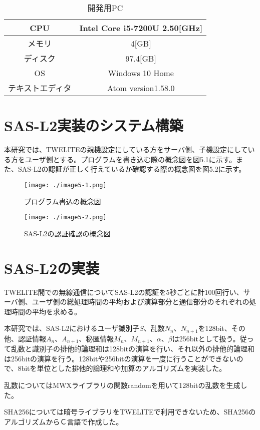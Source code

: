 \documentclass{thesis}
\begin{document}
\begin{table}[h]
  \centering
  \caption{開発用PC}
  \begin{tabular}{|c|c|} \hline
    CPU & Intel Core i5-7200U 2.50[GHz] \\ \hline
    メモリ & 4[GB] \\ \hline
    ディスク & 97.4[GB] \\ \hline
    OS & Windows 10 Home \\ \hline
    テキストエディタ & Atom version1.58.0 \\ \hline
  \end{tabular}
\end{table}

\section{SAS-L2実装のシステム構築}
本研究では、TWELITEの親機設定にしている方をサーバ側、子機設定にしている方をユーザ側とする。プログラムを書き込む際の概念図を図5.1に示す。また、SAS-L2の認証が正しく行えているか確認する際の概念図を図5.2に示す。

\begin{figure}[H]
 \center
 \texttt{[image: ./image5-1.png]}
 \caption{プログラム書込の概念図}
\end{figure}

\begin{figure}[H]
 \center
 \texttt{[image: ./image5-2.png]}
 \caption{SAS-L2の認証確認の概念図}
\end{figure}

\section{SAS-L2の実装}
TWELITE間での無線通信についてSAS-L2の認証を5秒ごとに計100回行い、サーバ側、ユーザ側の総処理時間の平均および演算部分と通信部分のそれぞれの処理時間の平均を求める。

本研究では、SAS-L2におけるユーザ識別子$S$、乱数$N_n$、$N_{n+1}$を128bit、その他、認証情報$A_n$、$A_{n+1}$、秘匿情報$M_n$、$M_{n+1}$、$\alpha$、$\beta$は256bitとして扱う。従って乱数と識別子の排他的論理和は128bitの演算を行い、それ以外の排他的論理和は256bitの演算を行う。128bitや256bitの演算を一度に行うことができないので、8bitを単位とした排他的論理和や加算のアルゴリズムを実装した。

乱数についてはMWXライブラリの関数randomを用いて128bitの乱数を生成した。

SHA256については暗号ライブラリをTWELITEで利用できないため、SHA256のアルゴリズムからＣ言語で作成した。
\end{document}
